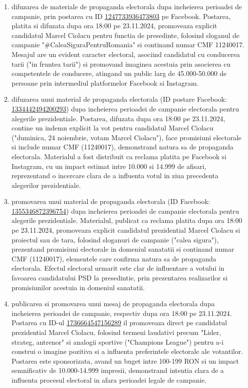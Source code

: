 \documentclass[a4paper,12pt]{article}
\begin{document}
\begin{enumerate}[leftmargin=*, label=\arabic*.)]
    \item difuzarea de materiale de propaganda electorala dupa incheierea perioadei de campanie, prin postarea cu ID \href{https://www.facebook.com/ads/library/?id=1247733936473803}{1247733936473803} pe Facebook. Postarea, platita si difuzata dupa ora 18:00 pe 23.11.2024, promoveaza explicit candidatul Marcel Ciolacu pentru functia de presedinte, folosind sloganul de campanie "\#CaleaSiguraPentruRomania" si continand numar CMF 11240017. Mesajul are un evident caracter electoral, asociind candidatul cu conducerea tarii ("in fruntea tarii") si promovand imaginea acestuia prin asocierea cu competentele de conducere, atingand un public larg de 45.000-50.000 de persoane prin intermediul platformelor Facebook si Instagram.
    \item difuzarea unui material de propaganda electorala (ID postare Facebook: \href{https://www.facebook.com/ads/library/?id=1334442494200293}{1334442494200293}) dupa incheierea perioadei de campanie electorala pentru alegerile prezidentiale. Postarea, difuzata dupa ora 18:00 pe 23.11.2024, contine un indemn explicit la vot pentru candidatul Marcel Ciolacu ("duminica, 24 noiembrie, votam Marcel Ciolacu"), face promisiuni electorale si include numar CMF (11240017), demonstrand natura sa de propaganda electorala. Materialul a fost distribuit ca reclama platita pe Facebook si Instagram, cu un impact estimat intre 10.000 si 14.999 de afisari, reprezentand o incercare clara de a influenta votul in ziua precedenta alegerilor prezidentiale.
    \item promovarea unui material de propaganda electorala (ID Facebook: \href{https://www.facebook.com/ads/library/?id=1355346872396754}{1355346872396754}) dupa incheierea perioadei de campanie electorala pentru alegerile prezidentiale. Materialul, publicat ca reclama platita dupa ora 18:00 pe 23.11.2024, promoveaza explicit candidatul prezidential Marcel Ciolacu si proiectul sau de tara, folosind sloganuri de campanie ("calea sigura"), prezentand promisiuni electorale in domeniul sanatatii si continand numar CMF (11240017), elementele care confirma natura sa de propaganda electorala. Efectul electoral urmarit este clar de influentare a votului in favoarea candidatului PSD la presedintie, prin prezentarea realizarilor si promisiunilor acestuia in domeniul sanatatii.
    \item publicarea si promovarea unui mesaj de propaganda electorala dupa incheierea perioadei de campanie, respectiv dupa ora 18:00 pe 23.11.2024. Postarea cu ID-ul \href{https://www.facebook.com/ads/library/?id=1736664547156289}{1736664547156289} il promoveaza direct pe candidatul prezidential Marcel Ciolacu, folosind termeni laudativi precum "Lider, strateg, antrenor" si analogii sportive ("Champions League") pentru a-i construi o imagine pozitiva si a influenta preferintele electorale ale votantilor. Postarea este sponsorizata, avand un buget intre 100-199 RON si un impact semnificativ de 10.000-14.999 impresii, demonstrand intentia clara de a influenta procesul electoral in afara perioadei legale de campanie.

\end{enumerate}
\end{document}
